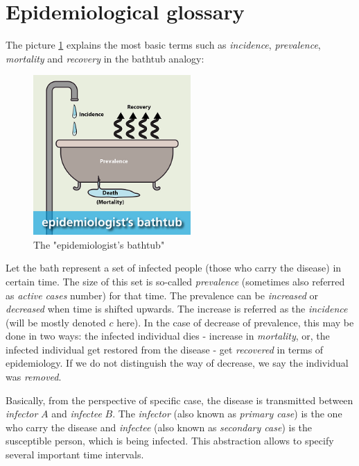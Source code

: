 \documentclass[
  digital, %
  oneside, %
  lof,     %
  lot,     %
]{fithesis4}
\begin{document}
\section{Epidemiological glossary}

The picture \ref{fig:epidemiologists-bathtub} explains the most basic
terms such as \textit{incidence}, \textit{prevalence}, \textit{mortality}
and \textit{recovery} in the bathtub analogy:

\begin{figure}[h]
  \begin{center}
    \includegraphics[width=6cm]{static/epidemiologists-bathtub.png}
  \end{center}
  \caption{The "epidemiologist's bathtub" \cite{arnold2020}}
  \label{fig:epidemiologists-bathtub}
\end{figure}

Let the bath represent a
set of infected people (those who carry the disease) in certain time.
The size of this set is so-called \textit{prevalence} (sometimes also referred 
as \textit{active cases} number) for that time.
The prevalence can be \textit{increased} or \textit{decreased} when time is shifted upwards.
The increase is referred as the \textit{incidence} (will be mostly denoted $c$ here).
In the case of decrease of prevalence, this may be done in two ways:
the infected individual dies - increase in \textit{mortality}, or, the
infected individual get restored from the disease - get 
\textit{recovered} in terms of epidemiology.
If we do not distinguish the way of decrease, we say the
individual was \textit{removed}.

Basically, from the perspective of specific case, the disease is
transmitted between \textit{infector} $A$ and \textit{infectee} $B$.
The \textit{infector} (also known as \textit{primary case}) is the one who carry the disease and
\textit{infectee} (also known as \textit{secondary case}) is the 
susceptible person, which is being infected.
This abstraction allows to specify several important time intervals.
\end{document}
